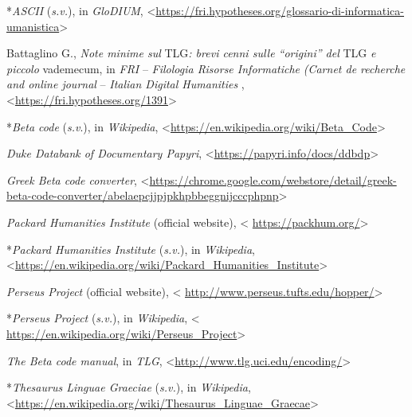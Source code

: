 \documentclass[
  b5paper,
  twoside,
  11pt,
  chapterprefix=false,
  bibliography=totocnumbered,
  parskip=0]{scrbook}
\begin{document}
*\emph{ASCII} (\emph{s.v.}), in \emph{GloDIUM},
\textless{}\href{https://fri.hypotheses.org/glossario-di-informatica-umanistica}{{https://fri.hypotheses.org/glossario-di-informatica-umanistica}}\textgreater{}

Battaglino G., \emph{Note minime sul} TLG\emph{: brevi cenni sulle \enquote{origini} del}
TLG \emph{e piccolo} vademecum, in \emph{FRI} -- \emph{Filologia Risorse Informatiche}
\emph{(Carnet de recherche and online journal} -- \emph{Italian Digital
Humanities} ,
\textless{}\href{https://fri.hypotheses.org/1391}{{https://fri.hypotheses.org/1391}}\textgreater{}

*\emph{Beta code} (\emph{s.v}.), in \emph{Wikipedia},
\textless{}\href{https://en.wikipedia.org/wiki/Beta_Code}{{https://en.wikipedia.org/wiki/Beta\_Code}}\textgreater{}

\emph{Duke Databank of Documentary Papyri},
\textless{}\href{https://papyri.info/docs/ddbdp}{{https://papyri.info/docs/ddbdp}}\textgreater{}

\emph{Greek Beta code converter},
\textless{}\href{https://chrome.google.com/webstore/detail/greek-beta-code-converter/abelaepcjjpjpkhpbbeggnijcccphpnp}{{https://chrome.google.com/webstore/detail/greek-beta-code-converter/abelaepcjjpjpkhpbbeggnijcccphpnp}}\textgreater{}

\emph{Packard Humanities Institute} (official website), \textless{}
\href{https://packhum.org/}{{https://packhum.org/}}\textgreater{}

*\emph{Packard Humanities Institute} (\emph{s.v.}), in \emph{Wikipedia},
\textless{}\href{https://en.wikipedia.org/wiki/Packard_Humanities_Institute}{{https://en.wikipedia.org/wiki/Packard\_Humanities\_Institute}}\textgreater{}

\emph{Perseus Project} (official website), \textless{}
\href{http://www.perseus.tufts.edu/hopper/}{{http://www.perseus.tufts.edu/hopper/}}\textgreater{}

*\emph{Perseus Project} (\emph{s.v.}), in \emph{Wikipedia}, \textless{}
\href{https://en.wikipedia.org/wiki/Perseus_Project}{{https://en.wikipedia.org/wiki/Perseus\_Project}}\textgreater{}

\emph{The Beta code manual}, in \emph{TLG},
\textless{}\href{http://www.tlg.uci.edu/encoding/}{{http://www.tlg.uci.edu/encoding/}}\textgreater{}

*\emph{Thesaurus Linguae Graeciae} (\emph{s.v.}), in \emph{Wikipedia},
\textless{}\href{https://en.wikipedia.org/wiki/Thesaurus_Linguae_Graecae}{{https://en.wikipedia.org/wiki/Thesaurus\_Linguae\_Graecae}}\textgreater{}
\end{document}
